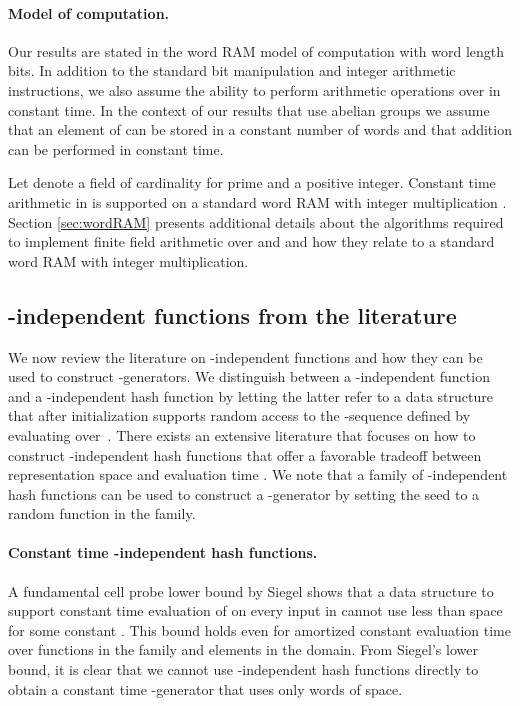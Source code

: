 \documentclass[a4paper,11pt]{article}
\theoremstyle{plain}
\theoremstyle{definition}
\begin{document}
\paragraph{Model of computation.}
Our results are stated in the word RAM model of computation with word length  bits. 
In addition to the standard bit manipulation and integer arithmetic instructions, we also assume the ability to perform arithmetic operations  over  in constant time. 
In the context of our results that use abelian groups  we assume that an element of  can be stored in a constant number of words and that addition can be performed in constant time. 

Let  denote a field of cardinality  for  prime and  a positive integer.
Constant time arithmetic in  is supported on a standard word RAM with integer multiplication \cite{granlund1994}. 
Section \ref{sec:wordRAM} presents additional details about the algorithms required to implement finite field arithmetic over  and  and how they relate to a standard word RAM with integer multiplication.
\subsection{-independent functions from the literature} \label{sec:hashing}
We now review the literature on -independent functions and how they can be used to construct -generators.
We distinguish between a -independent function  and a -independent hash function by letting the latter refer to a data structure 
that after initialization supports random access to the -sequence defined by evaluating  over~.  
There exists an extensive literature that focuses on how to construct -independent hash functions that offer a favorable tradeoff between representation space and evaluation time \cite{dietzfelbinger2012}. 
We note that a family of -independent hash functions can be used to construct a -generator by setting the seed to a random function in the family.

\paragraph{Constant time -independent hash functions.}
A fundamental cell probe lower bound by Siegel \cite{siegel2004} shows that a data structure to support constant time evaluation of  on every input in  
cannot use less than  space for some constant . 
This bound holds even for amortized constant evaluation time over functions in the family and elements in the domain.
From Siegel's lower bound, it is clear that we cannot use -independent hash functions directly to obtain a constant time -generator that uses only  words of space.
\end{document}
